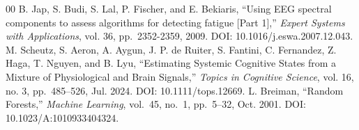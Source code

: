 \documentclass[letterpaper, 10 pt, conference]{ieeeconf}  %
\begin{document}
\begin{thebibliography}{00}
 B. Jap, S. Budi, S. Lal, P. Fischer, and E. Bekiaris,  
    ``Using EEG spectral components to assess algorithms for detecting fatigue [Part 1],''  
    \textit{Expert Systems with Applications}, vol. 36, pp.~2352-2359, 2009. DOI: 10.1016/j.eswa.2007.12.043.
 M. Scheutz, S. Aeron, A. Aygun, J. P. de Ruiter, S. Fantini, C. Fernandez, Z. Haga, T. Nguyen, and B. Lyu,  
    ``Estimating Systemic Cognitive States from a Mixture of Physiological and Brain Signals,''  
    \textit{Topics in Cognitive Science}, vol. 16, no. 3, pp.~485--526, Jul. 2024. DOI: 10.1111/tops.12669.
 L. Breiman,  
    ``Random Forests,''
    \textit{Machine Learning}, vol.~45, no.~1, pp.~5--32, Oct. 2001. DOI: 10.1023/A:1010933404324.

\end{thebibliography}
\end{document}
